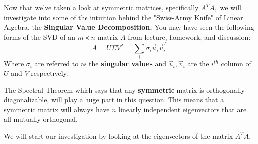 

Now that we've taken a look at symmetric matrices, specifically $A^{T} A,$ we will investigate into some of the intuition behind the "Swiss-Army Knife" of Linear Algebra, the \textbf{Singular Value Decomposition.} You may have seen the following forms of the SVD of an $m \times n$ matrix $A$ from lecture, homework, and discussion:
\begin{equation}
  A = U \Sigma V^{T} = \sum\limits_{i} \sigma_{i} \vec{u}_{i} \vec{v}_{i}^T
\end{equation}
Where $\sigma_{i}$ are referred to as the \textbf{singular values} and $\vec{u}_{i}, \vec{v}_{i}$ are the $i^{th}$ column of $U$ and $V$ respectively.

The Spectral Theorem which says that any \textbf{symmetric} matrix is orthogonally diagonalizable, will play a huge part in this question. 
This means that a symmetric matrix will always have $n$ linearly independent eigenvectors that are all mutually orthogonal.

We will start our investigation by looking at the eigenvectors of the matrix $A^{T} A.$

